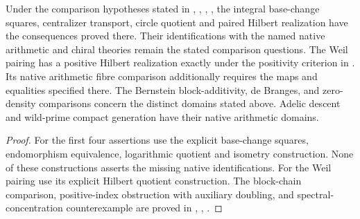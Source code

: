 \begin{theorem}
\label{v4-arith:w6-i:summary}
Under the comparison hypotheses stated in
, , , ,
the integral base-change squares, centralizer transport, circle
quotient and paired Hilbert realization have the consequences proved
there. Their identifications with the named native arithmetic and
chiral theories remain the stated comparison questions. The Weil pairing has a positive Hilbert
realization exactly under the positivity criterion in
.
Its native arithmetic fibre comparison additionally requires the
maps and equalities specified there.
The Bernstein block-additivity, de Branges, and zero-density
comparisons concern the distinct domains stated above. Adelic descent
and wild-prime compact generation have their native arithmetic domains.
\end{theorem}
\begin{proof}
For the first four assertions use the explicit base-change squares,
endomorphism equivalence, logarithmic quotient and isometry construction.
None of these constructions asserts the missing native identifications.
For the Weil pairing use its explicit Hilbert quotient construction.
The block-chain comparison, positive-index obstruction with
auxiliary doubling, and spectral-concentration counterexample are
proved in
, , .
\end{proof}
